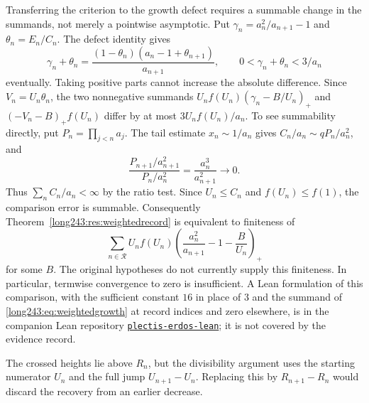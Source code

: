 \documentclass[11pt]{article}
\begin{document}
Transferring the criterion to the growth defect requires a summable
change in the summands, not merely a pointwise asymptotic. Put
$\gamma_n=a_n^2/a_{n+1}-1$ and $\theta_n=E_n/C_n$. The defect identity gives
\[
 \gamma_n+\theta_n=
 \frac{(1-\theta_n)(a_n-1+\theta_{n+1})}{a_{n+1}},
 \qquad 0<\gamma_n+\theta_n<3/a_n
\]
eventually. Taking positive parts cannot increase the absolute difference.
Since $V_n=U_n\theta_n$, the two nonnegative summands
$U_nf(U_n)(\gamma_n-B/U_n)_+$ and $(-V_n-B)_+f(U_n)$ differ by at most
$3U_nf(U_n)/a_n$. To see summability directly, put $P_n=\prod_{j<n}a_j$.
The tail estimate $x_n\sim1/a_n$ gives $C_n/a_n\sim qP_n/a_n^2$, and
\[
 \frac{P_{n+1}/a_{n+1}^{2}}{P_n/a_n^{2}}
 =\frac{a_n^3}{a_{n+1}^{2}}\longrightarrow0.
\]
Thus $\sum_n C_n/a_n<\infty$ by the ratio test. Since $U_n\le C_n$ and
$f(U_n)\le f(1)$, the comparison error is summable.
Consequently Theorem~\ref{long243:res:weightedrecord} is equivalent to finiteness of
\begin{equation}\label{long243:eq:weightedgrowth}
 \sum_{n\in\mathcal R}U_nf(U_n)
 \left(\frac{a_n^2}{a_{n+1}}-1-\frac B{U_n}\right)_+
\end{equation}
for some $B$. The original hypotheses do not currently supply this
finiteness. In particular, termwise convergence to zero is insufficient.
A Lean formulation of this comparison, with the sufficient constant $16$
in place of $3$ and the summand of \eqref{long243:eq:weightedgrowth} at
record indices and zero elsewhere, is in the companion Lean repository
\href{https://github.com/wcook04/plectis-erdos-lean/blob/52f29ad173b04e3bac941b3663f2b9aebe5de0bb/ErdosProblems/Erdos243/PaperCompleteR8/GrowthDebtSummability.lean\#L234}{\texttt{plectis-erdos-lean}};
it is not covered by the evidence record.

The crossed heights lie above $R_n$, but the divisibility argument uses
the starting numerator $U_n$ and the full jump $U_{n+1}-U_n$. Replacing
this by $R_{n+1}-R_n$ would discard the recovery from an earlier decrease.
\end{document}
